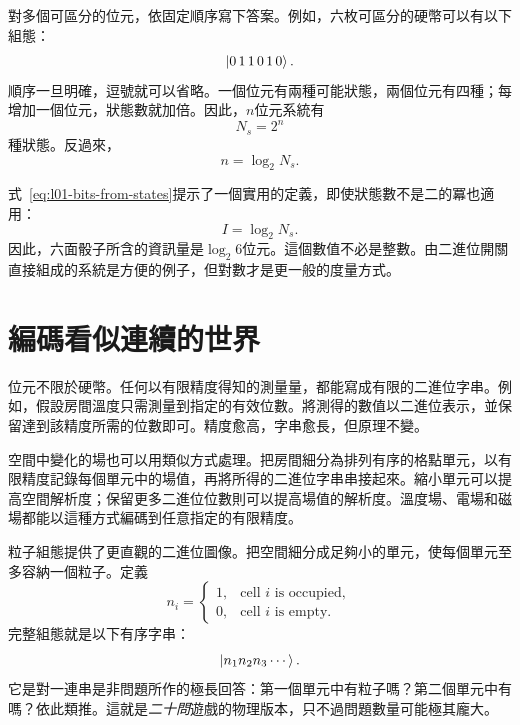 對多個可區分的位元，依固定順序寫下答案。例如，六枚可區分的硬幣可以有以下組態：
\begin{equation}
  \left\lvert0\,1\,1\,0\,1\,0\right\rangle.
\end{equation}
順序一旦明確，逗號就可以省略。一個位元有兩種可能狀態，兩個位元有四種；每增加一個位元，狀態數就加倍。因此，\(n\)位元系統有
\begin{equation}
  N_s=2^n
  \label{eq:l01-state-count}
\end{equation}
種狀態。反過來，
\begin{equation}
  n=\log_2 N_s.
  \label{eq:l01-bits-from-states}
\end{equation}

式~\eqref{eq:l01-bits-from-states}提示了一個實用的定義，即使狀態數不是二的冪也適用：
\begin{equation}
  I=\log_2 N_s.
  \label{eq:l01-information}
\end{equation}
因此，六面骰子所含的資訊量是\(\log_2 6\)位元。這個數值不必是整數。由二進位開關直接組成的系統是方便的例子，但對數才是更一般的度量方式。

\section{編碼看似連續的世界}

位元不限於硬幣。任何以有限精度得知的測量量，都能寫成有限的二進位字串。例如，假設房間溫度只需測量到指定的有效位數。將測得的數值以二進位表示，並保留達到該精度所需的位數即可。精度愈高，字串愈長，但原理不變。

空間中變化的場也可以用類似方式處理。把房間細分為排列有序的格點單元，以有限精度記錄每個單元中的場值，再將所得的二進位字串串接起來。縮小單元可以提高空間解析度；保留更多二進位位數則可以提高場值的解析度。溫度場、電場和磁場都能以這種方式編碼到任意指定的有限精度。

粒子組態提供了更直觀的二進位圖像。把空間細分成足夠小的單元，使每個單元至多容納一個粒子。定義
\begin{equation}
  n_i=
  \begin{cases}
    1,&\text{cell \(i\) is occupied},\\
    0,&\text{cell \(i\) is empty}.
  \end{cases}
  \label{eq:l01-occupancy-bit}
\end{equation}
完整組態就是以下有序字串：
\begin{equation}
  \left\lvert n_1n_2n_3\cdots\right\rangle.
\end{equation}
它是對一連串是非問題所作的極長回答：第一個單元中有粒子嗎？第二個單元中有嗎？依此類推。這就是\emph{二十問}遊戲的物理版本，只不過問題數量可能極其龐大。

